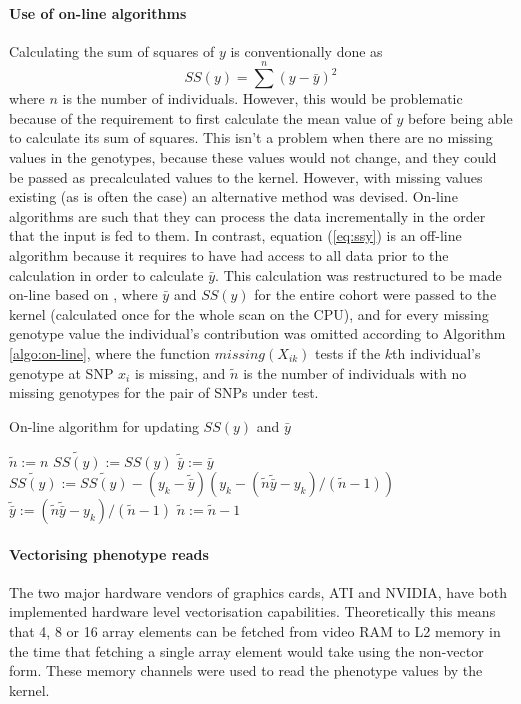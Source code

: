 \paragraph{Use of on-line algorithms} Calculating the sum of squares of $y$ is conventionally done as
\begin{equation}
SS(y) = \sum^n (y - \bar{y})^2 \label{eq:ssy}
\end{equation}
where $n$ is the number of individuals. However, this would be problematic because of the requirement to first calculate the mean value of $y$ before being able to calculate its sum of squares. This isn't a problem when there are no missing values in the genotypes, because these values would not change, and they could be passed as precalculated values to the kernel. However, with missing values existing (as is often the case) an alternative method was devised. On-line algorithms are such that they can process the data incrementally in the order that the input is fed to them. In contrast, equation (\ref{eq:ssy}) is an off-line algorithm because it requires to have had access to all data prior to the calculation in order to calculate $\bar{y}$. This calculation was restructured to be made on-line based on \cite{Welford1962}, where $\bar{y}$ and $SS(y)$ for the entire cohort were passed to the kernel (calculated once for the whole scan on the CPU), and for every missing genotype value the individual's contribution was omitted according to Algorithm \ref{algo:on-line}, where the function $missing(X_{ik})$ tests if the $k$th individual's genotype at SNP $x_i$ is missing, and $\tilde{n}$ is the number of individuals with no missing genotypes for the pair of SNPs under test.

\begin{algorithm}
\caption{On-line algorithm for updating $SS(y)$ and $\bar{y}$}
\label{algo:on-line}
\begin{algorithmic}

\STATE $\tilde{n} := n$
\STATE $\tilde{SS(y)} := SS(y)$
\STATE $\tilde{\bar{y}} := \bar{y}$
\STATE $\tilde{SS(y)} := \tilde{SS(y)} - (y_k - \tilde{\bar{y}})(y_k - (\tilde{n}\tilde{\bar{y}} - y_k)/(\tilde{n}-1))$
\STATE $\tilde{\bar{y}} := (\tilde{n}\tilde{\bar{y}} - y_k)/(\tilde{n}-1)$
\STATE $\tilde{n} := \tilde{n} - 1$
\ENDIF
\ENDFOR

\end{algorithmic}
\end{algorithm}


\paragraph{Vectorising phenotype reads} The two major hardware vendors of graphics cards, ATI and NVIDIA, have both implemented hardware level vectorisation capabilities. Theoretically this means that 4, 8 or 16 array elements can be fetched from video RAM to L2 memory in the time that fetching a single array element would take using the non-vector form. These memory channels were used to read the phenotype values by the kernel.


